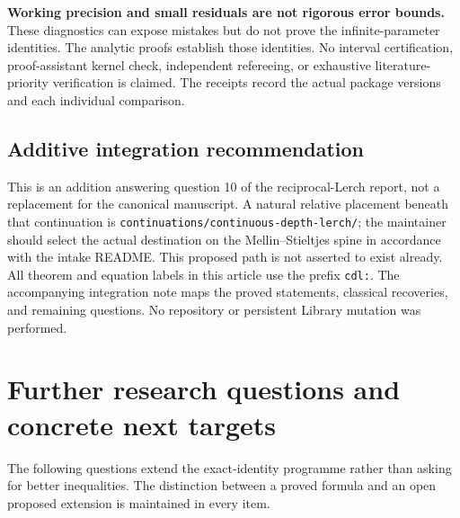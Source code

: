 \documentclass[11pt,letterpaper]{article}
\numberwithin{equation}{section}
\theoremstyle{definition}\newtheorem{definition}[theorem]{Definition}
\theoremstyle{remark}\newtheorem{remark}[theorem]{Remark}
\newcommand{\src}[1]{\nolinkurl{#1}}
\begin{document}
\textbf{Working precision and small residuals are not rigorous error
bounds.} These diagnostics can expose mistakes but do not prove the
infinite-parameter identities. The analytic proofs establish those
identities. No interval certification, proof-assistant kernel check,
independent refereeing, or exhaustive literature-priority verification
is claimed. The receipts record the actual package versions and each
individual comparison.

\subsection{Additive integration recommendation}
This is an addition answering question 10 of the reciprocal-Lerch report,
not a replacement for the canonical manuscript. A natural relative
placement beneath that continuation is
\src{continuations/continuous-depth-lerch/}; the maintainer should select
the actual destination on the Mellin--Stieltjes spine in accordance with
the intake README. This proposed path is not asserted to exist already.
All theorem and equation labels in this article use the prefix
\src{cdl:}. The accompanying integration note maps the proved statements,
classical recoveries, and remaining questions. No repository or persistent
Library mutation was performed.

\section{Further research questions and concrete next targets}
\label{cdl:sec:research}

The following questions extend the exact-identity programme rather than
asking for better inequalities. The distinction between a proved formula
and an open proposed extension is maintained in every item.
\end{document}
